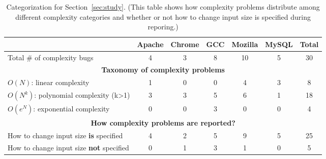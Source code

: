 \begin{table*}[tb!]
\begin{adjustwidth}{-.5in}{-.5in}
\small
\centering
{
\begin{tabular}{|lcccccc|}
\hline
                                                               &   Apache  &   Chrome   &  GCC   &    Mozilla   &   MySQL  &  Total\\
\hline
Total \# of complexity bugs                                          &   4       &    3       &   8    &    10        &   5      &   30 \\
\hline
\multicolumn{7}{|c|}{\bf Taxonomy of complexity problems}\\
\multicolumn{1}{|l}{{\bf $O(N)$}: linear complexity}                 &   1       &    0       &   0    &    4         &   3      &   8\\
\multicolumn{1}{|l}{{\bf $O(N^k)$}: polynomial complexity (k>1)}     &   3       &    3       &   5    &    6         &   1      &  18\\
\multicolumn{1}{|l}{{\bf $O(e^N)$}: exponential complexity}          &   0       &    0       &   3    &    0         &   0      &   4\\
\hline
\multicolumn{7}{|c|}{\bf How complexity problems are reported?}\\
\multicolumn{1}{|l}{How to change input size {\bf is} specified}     &  4&2&5&9&5&25\\
\multicolumn{1}{|l}{How to change input size {\bf not} specified}    &  0&1&3&1&0&5\\
\hline
\end{tabular}
}
\end{adjustwidth}
\caption{Categorization for Section~\ref{sec:study}.
(This table shows how complexity problems distribute among different complexity categories 
 and whether or not how to change input size is specified during reporing.)}
\label{tab:study}
\end{table*}
